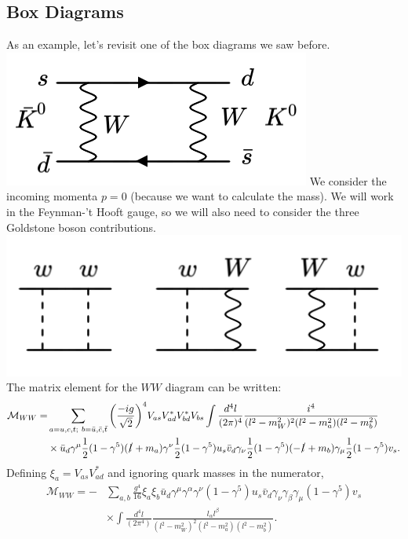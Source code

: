 \subsection{Box Diagrams}
%
As an example, let's revisit one of the box diagrams we saw before.
\newline
  \includegraphics[width=0.6\linewidth]{figs/49c.png}
\newline
We consider the incoming momenta $p=0$ (because we want to calculate the mass). We will work in the Feynman-'t Hooft gauge, so we will also need to consider the three Goldstone boson contributions.
\newline
  \includegraphics[width=0.6\linewidth]{figs/51a.png}
\newline
The matrix element for the $WW$ diagram can be written:
\begin{equation}
\begin{split}
\mathcal{M}_{WW} = &\sum_{a=u,c,t;\ b=\bar{u},\bar{c},\bar{t}} \bigg(\frac{-ig}{\sqrt{2}}\bigg)^4 V_{as}V_{ad}^* V^*_{bd}V_{bs} \int \frac{d^4l}{(2\pi)^4}\frac{i^4}{(l^2-m_W^2)^2(l^2-m_a^2)(l^2-m_b^2)} \\
&\times \bar{u}_d \gamma^\mu\frac{1}{2}(1-\gamma^5)(\slashed{l}+m_a)\gamma^\nu \frac{1}{2}(1-\gamma^5) u_s \bar{v}_d \gamma_\nu \frac{1}{2}(1-\gamma^5)(-\slashed{l}+m_b)\gamma_\mu \frac{1}{2}(1-\gamma^5)v_s.
\end{split}
\end{equation}
Defining $\xi_a = V_{as}V_{ad}^*$ and ignoring quark masses in the numerator,
\begin{equation}
\begin{split}
\mathcal{M}_{WW} = -&\sum_{a,b} \frac{g^4}{16} \xi_a \xi_b \bar{u}_d \gamma^\mu \gamma^\alpha \gamma^\nu (1-\gamma^5) u_s \bar{v}_d \gamma_\nu \gamma_\beta \gamma_\mu(1-\gamma^5)v_s \\
&\times \int \frac{d^4l}{(2\pi^4)} \frac{l_\alpha l^\beta}{(l^2-m_W^2)^2(l^2-m_a^2)(l^2-m_b^2)}. 
\end{split}
\end{equation}
